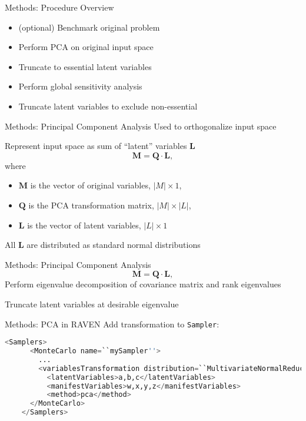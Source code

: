 \documentclass[t,9pt,svgnames]{beamer}
\newenvironment{codebox}{}{}
\newcommand{\code}[1]{\texttt{#1}}
\begin{document}
\begin{frame}{Methods: Procedure Overview}
  \begin{itemize}
    \item (optional) Benchmark original problem
    \item Perform PCA on original input space
    \item Truncate to essential latent variables
    \item Perform global sensitivity analysis
    \item Truncate latent variables to exclude non-essential
  \end{itemize}
\end{frame}

\begin{frame}{Methods: Principal Component Analysis}
  Used to orthogonalize input space

  Represent input space as sum of ``latent'' variables $\bm{L}$
  \begin{equation}
    \bm{M} = \bm{Q} \cdot \bm{L},
  \end{equation}
  where
  \begin{itemize}
    \item $\bm{M}$ is the vector of original variables, $|M|\times1$,
    \item $\bm{Q}$ is the PCA transformation matrix, $|M|\times |L|$,
    \item $\bm{L}$ is the vector of latent variables, $|L|\times 1$
  \end{itemize}
  All $\bm{L}$ are distributed as standard normal distributions
\end{frame}

\begin{frame}{Methods: Principal Component Analysis}
  \begin{equation}
    \bm{M} = \bm{Q} \cdot \bm{L},
  \end{equation}
  Perform eigenvalue decomposition of covariance matrix and rank eigenvalues

  Truncate latent variables at desirable eigenvalue
\end{frame}

\begin{frame}{Methods: PCA in RAVEN}
  Add transformation to \code{Sampler}:
  \begin{codebox}
    \begin{lstlisting}[basicstyle=\ttfamily\scriptsize,frame=single,backgroundcolor=\color{cbbkng},language=python]
    <Samplers>
      <MonteCarlo name=``mySampler''>
        ...
        <variablesTransformation distribution=``MultivariateNormalReduction''>
          <latentVariables>a,b,c</latentVariables>
          <manifestVariables>w,x,y,z</manifestVariables>
          <method>pca</method>
      </MonteCarlo>
    </Samplers>
    \end{lstlisting}
  \end{codebox}
\end{frame}
\end{document}

